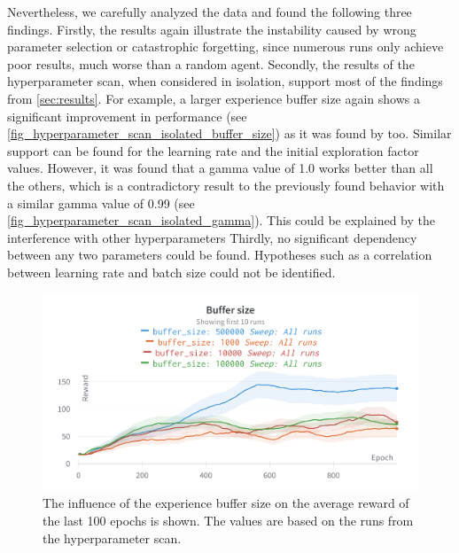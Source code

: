 \documentclass{article}
\begin{document}
Nevertheless, we carefully analyzed the data and found the following three findings.
Firstly, the results again illustrate the instability caused by wrong parameter selection or catastrophic forgetting, 
since numerous runs only achieve poor results, much worse than a random agent. 
Secondly, the results of the hyperparameter scan, when considered in isolation, 
support most of the findings from \autoref{sec:results}. 
For example, a larger experience buffer size again shows a significant improvement in performance (see \autoref{fig_hyperparameter_scan_isolated_buffer_size})
as it was found by \cite{DBLP:conf/icml/FedusRABLRD20} too. 
Similar support can be found for the learning rate and the initial exploration factor values.
However, it was found that a gamma value of 1.0 works better than all the others, 
which is a contradictory result to the previously found behavior with a similar gamma value of 0.99 (see \autoref{fig_hyperparameter_scan_isolated_gamma}).
This could be explained by the interference with other hyperparameters
Thirdly, no significant dependency between any two parameters could be found.
Hypotheses such as a correlation between learning rate and batch size could not be identified. 

\begin{figure}[ht!]
   \centering
   \includegraphics[width=\columnwidth]{assets/hyperparamter-scan/W&B Chart Buffer size.png}
   \caption{The influence of the experience buffer size on the average reward of the last 100 epochs is shown. The values are based on the runs from the hyperparameter scan.
   }
   \label{fig_hyperparameter_scan_isolated_buffer_size}
\end{figure}
\end{document}
